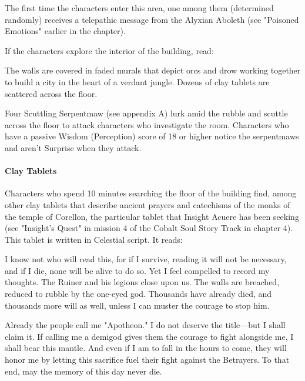 \documentclass[10pt,a4paper,twoside,bg=print,twocolumn,openany,nodeprecatedcode]{dndbook}
\begin{document}
The first time the characters enter this area, one among them (determined randomly) receives a telepathic message from the Alyxian Aboleth (see "Poisoned Emotions" earlier in the chapter).

If the characters explore the interior of the building, read:

\begin{DndReadAloud}{}
The walls are covered in faded murals that depict orcs and drow working together to build a city in the heart of a verdant jungle. Dozens of clay tablets are scattered across the floor.

\end{DndReadAloud}

Four Scuttling Serpentmaw (see appendix A) lurk amid the rubble and scuttle across the floor to attack characters who investigate the room. Characters who have a passive Wisdom (Perception) score of 18 or higher notice the serpentmaws and aren't Surprise when they attack.

\paragraph{Clay Tablets}
Characters who spend 10 minutes searching the floor of the building find, among other clay tablets that describe ancient prayers and catechisms of the monks of the temple of Corellon, the particular tablet that Insight Acuere has been seeking (see "Insight's Quest" in mission 4 of the Cobalt Soul Story Track in chapter 4). This tablet is written in Celestial script. It reads:

\begin{DndReadAloud}{}
I know not who will read this, for if I survive, reading it will not be necessary, and if I die, none will be alive to do so. Yet I feel compelled to record my thoughts. The Ruiner and his legions close upon us. The walls are breached, reduced to rubble by the one-eyed god. Thousands have already died, and thousands more will as well, unless I can muster the courage to stop him.

Already the people call me "Apotheon." I do not deserve the title—but I shall claim it. If calling me a demigod gives them the courage to fight alongside me, I shall bear this mantle. And even if I am to fall in the hours to come, they will honor me by letting this sacrifice fuel their fight against the Betrayers. To that end, may the memory of this day never die.

\end{DndReadAloud}
\end{document}
